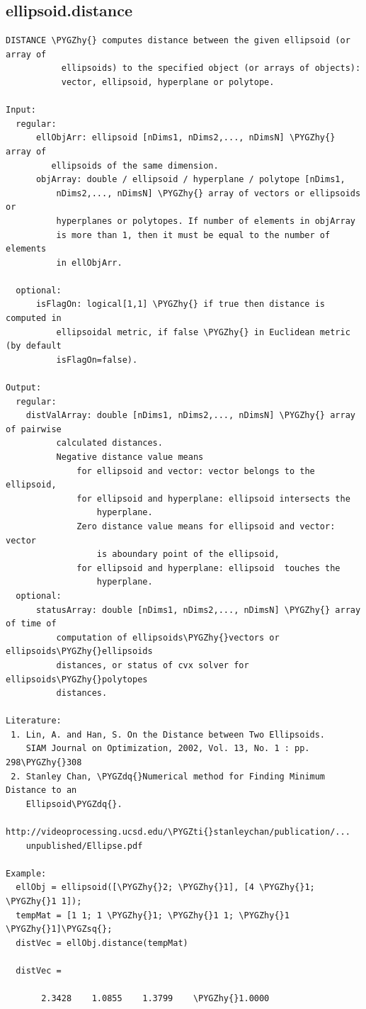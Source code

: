 \documentclass[letterpaper,10pt,english]{sphinxmanual}
\def\PYGZhy{\char`\-}
\def\PYGZsq{\char`\'}
\def\PYGZdq{\char`\"}
\def\PYGZti{\char`\~}
\begin{document}
\subsection{ellipsoid.distance}
\label{chap_functions:ellipsoid-distance}
\begin{Verbatim}[commandchars=\\\{\}]
DISTANCE \PYGZhy{} computes distance between the given ellipsoid (or array of
           ellipsoids) to the specified object (or arrays of objects):
           vector, ellipsoid, hyperplane or polytope.

Input:
  regular:
      ellObjArr: ellipsoid [nDims1, nDims2,..., nDimsN] \PYGZhy{}  array of
         ellipsoids of the same dimension.
      objArray: double / ellipsoid / hyperplane / polytope [nDims1,
          nDims2,..., nDimsN] \PYGZhy{} array of vectors or ellipsoids or
          hyperplanes or polytopes. If number of elements in objArray
          is more than 1, then it must be equal to the number of elements
          in ellObjArr.

  optional:
      isFlagOn: logical[1,1] \PYGZhy{} if true then distance is  computed in
          ellipsoidal metric, if false \PYGZhy{} in Euclidean metric (by default
          isFlagOn=false).

Output:
  regular:
    distValArray: double [nDims1, nDims2,..., nDimsN] \PYGZhy{} array of pairwise
          calculated distances.
          Negative distance value means
              for ellipsoid and vector: vector belongs to the ellipsoid,
              for ellipsoid and hyperplane: ellipsoid intersects the
                  hyperplane.
              Zero distance value means for ellipsoid and vector: vector
                  is aboundary point of the ellipsoid,
              for ellipsoid and hyperplane: ellipsoid  touches the
                  hyperplane.
  optional:
      statusArray: double [nDims1, nDims2,..., nDimsN] \PYGZhy{} array of time of
          computation of ellipsoids\PYGZhy{}vectors or ellipsoids\PYGZhy{}ellipsoids
          distances, or status of cvx solver for ellipsoids\PYGZhy{}polytopes
          distances.

Literature:
 1. Lin, A. and Han, S. On the Distance between Two Ellipsoids.
    SIAM Journal on Optimization, 2002, Vol. 13, No. 1 : pp. 298\PYGZhy{}308
 2. Stanley Chan, \PYGZdq{}Numerical method for Finding Minimum Distance to an
    Ellipsoid\PYGZdq{}.
    http://videoprocessing.ucsd.edu/\PYGZti{}stanleychan/publication/...
    unpublished/Ellipse.pdf

Example:
  ellObj = ellipsoid([\PYGZhy{}2; \PYGZhy{}1], [4 \PYGZhy{}1; \PYGZhy{}1 1]);
  tempMat = [1 1; 1 \PYGZhy{}1; \PYGZhy{}1 1; \PYGZhy{}1 \PYGZhy{}1]\PYGZsq{};
  distVec = ellObj.distance(tempMat)

  distVec =

       2.3428    1.0855    1.3799    \PYGZhy{}1.0000
\end{Verbatim}
\end{document}
